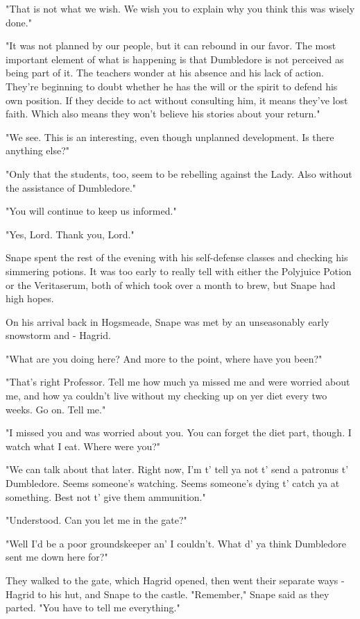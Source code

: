\documentclass[a4paper,11pt]{article}
\begin{document}
"That is not what we wish. We wish you to explain why you think this was wisely done."

"It was not planned by our people, but it can rebound in our favor. The most important element of what is happening is that Dumbledore is not perceived as being part of it. The teachers wonder at his absence and his lack of action. They're beginning to doubt whether he has the will or the spirit to defend his own position. If they decide to act without consulting him, it means they've lost faith. Which also means they won't believe his stories about your return."

"We see. This is an interesting, even though unplanned development. Is there anything else?"

"Only that the students, too, seem to be rebelling against the Lady. Also without the assistance of Dumbledore."

"You will continue to keep us informed."

"Yes, Lord. Thank you, Lord."

Snape spent the rest of the evening with his self-defense classes and checking his simmering potions. It was too early to really tell with either the Polyjuice Potion or the Veritaserum, both of which took over a month to brew, but Snape had high hopes.

On his arrival back in Hogsmeade, Snape was met by an unseasonably early snowstorm and - Hagrid.

"What are you doing here? And more to the point, where have you been?"

"That's right Professor. Tell me how much ya missed me and were worried about me, and how ya couldn't live without my checking up on yer diet every two weeks. Go on. Tell me."

"I missed you and was worried about you. You can forget the diet part, though. I watch what I eat. Where were you?"

"We can talk about that later. Right now, I'm t' tell ya not t' send a patronus t' Dumbledore. Seems someone's watching. Seems someone's dying t' catch ya at something. Best not t' give them ammunition."

"Understood. Can you let me in the gate?"

"Well I'd be a poor groundskeeper an' I couldn't. What d' ya think Dumbledore sent me down here for?"

They walked to the gate, which Hagrid opened, then went their separate ways - Hagrid to his hut, and Snape to the castle. "Remember," Snape said as they parted. "You have to tell me everything."
\end{document}
